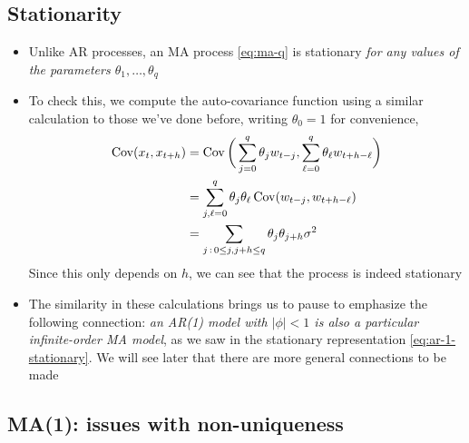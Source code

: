 \documentclass{article}
\begin{document}
\subsection{Stationarity}

\begin{itemize}
\item Unlike AR processes, an MA process \eqref{eq:ma-q} is stationary \emph{for
    any values of the parameters $\theta_1,\dots,\theta_q$}

\item To check this, we compute the auto-covariance function using a similar
  calculation to those we've done before, writing $\theta_0 = 1$ for
  convenience,
  \begin{align}
  \nonumber
  \operatorname{Cov}(x_t, x_{t+h}) &= \operatorname{Cov}\bigg( \sum_{j=0}^q \theta_j w_{t-j}, 
  \sum_{\ell=0}^q \theta_\ell w_{t+h-\ell} \bigg) \\
  \nonumber
  &= \sum_{j,\ell=0}^q \theta_j \theta_\ell \operatorname{Cov}( w_{t-j}, w_{t+h-\ell} ) \\
  \label{eq:ma-q-auto-cov}
  &= \sum_{j \,:\, 0 \leq j,  j +h \leq q} \theta_j \theta_{j+h} \sigma^2
  \end{align}
  Since this only depends on $h$, we can see that the process is indeed
  stationary 

\item The similarity in these calculations brings us to pause to emphasize the
  following connection: \emph{an AR(1) model with $|\phi| < 1$ is also a
    particular infinite-order MA model}, as we saw in the stationary
  representation \eqref{eq:ar-1-stationary}. We will see later that there are
  more general connections to be made
\end{itemize}

\subsection{MA(1): issues with non-uniqueness}
\end{document}
